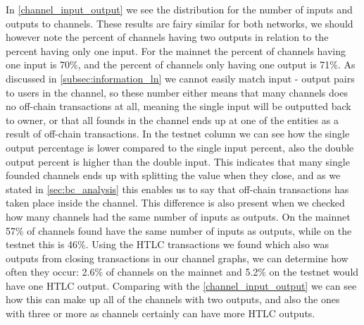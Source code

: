 In \cref{channel_input_output} we see the distribution for the number of inputs and outputs to channels. These results are fairy similar for both networks, we should however note the percent of channels having two outputs in relation to the percent having only one input. For the mainnet the percent of channels having one input is 70\%, and the percent of channels only having one output is 71\%. As discussed in \cref{subsec:information_ln} we cannot easily match input - output pairs to users in the channel, so these number either means that many channels does no off-chain transactions at all, meaning the single input will be outputted back to owner, or that all founds in the channel ends up at one of the entities as a result of off-chain transactions. In the testnet column we can see how the single output percentage is lower compared to the single input percent, also the double output percent is higher than the double input. This indicates that many single founded channels ends up with splitting the value when they close, and as we stated in \cref{sec:bc_analysis} this enables us to say that off-chain transactions has taken place inside the channel.
This difference is also present when we checked how many channels had the same number of inputs as outputs. On the mainnet 57\% of channels found have the same number of inputs as outputs, while on the testnet this is 46\%. 
Using the HTLC transactions we found which also was outputs from closing transactions in our channel graphs, we can determine how often they occur: 2.6\% of channels on the mainnet and 5.2\% on the testnet would have one HTLC output. Comparing with the \cref{channel_input_output} we can see how this can make up all of the channels with two outputs, and also the ones with three or more as channels certainly can have more HTLC outputs.
\\


